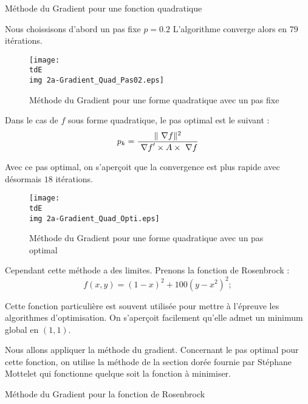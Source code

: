 		\begin{listing}[H]
			\caption{Méthode du Gradient pour une fonction quadratique}
			\label{code-5-methGradQuad}
		\end{listing}

		Nous choissisons d'abord un pas fixe $p = 0.2$
		L'algorithme converge alors en $79$ itérations.
		\begin{figure}[H]
			\centering
			\texttt{[image: \\tdE\\img 2a-Gradient\_Quad\_Pas02.eps]}
			\caption{Méthode du Gradient pour une forme quadratique avec un pas fixe}
			\label{img-5-methGradQuadFixe}
		\end{figure}

		Dans le cas de $f$ sous forme quadratique, le pas optimal est le suivant :
		\begin{equation}
			\label{eq-5-pasOptimal}
			p_k = \frac{\lVert ~\nabla f \rVert^2}{{~\nabla f}' \times A \times ~\nabla f}
		\end{equation}

		Avec ce pas optimal, on s'aperçoit que la convergence est plus rapide avec désormais $18$ itérations.
		\begin{figure}[H]
			\centering
			\texttt{[image: \\tdE\\img 2a-Gradient\_Quad\_Opti.eps]}
			\caption{Méthode du Gradient pour une forme quadratique avec un pas optimal}
			\label{img-5-methGradQuadOpti}
		\end{figure}

		Cependant cette méthode a des limites. Prenons la fonction de Rosenbrock :
		\begin{equation}
			\label{eq-5-fRosenbrock}
			f(x,y) = (1-x)^2 + 100(y-x^2)^2;
		\end{equation}

		Cette fonction particulière est souvent utilisée pour mettre à l'épreuve les algorithmes d'optimisation.
		On s'aperçoit facilement qu'elle admet un minimum global en $(1,1)$.

		Nous allons appliquer la méthode du gradient.
		Concernant le pas optimal pour cette fonction, on utilise la méthode de la section dorée fournie par Stéphane Mottelet qui fonctionne quelque soit la fonction à minimiser.

		\begin{listing}[H]
			\caption{Méthode du Gradient pour la fonction de Rosenbrock}
			\label{code-5-methGradRosen}
		\end{listing}
				
